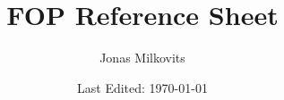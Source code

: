 

\renewcommand{\arraystretch}{1.75} 


\begin{titlepage}
  \title{FOP Reference Sheet} %
  \author{Jonas Milkovits}
  \date{Last Edited: \today}
\end{titlepage}



\maketitle
{} %
\tableofcontents
\clearpage
{} %

\begin{comment}
\section{Stuff that I skipped cuz of chapter 4}

\begin{tabular}{ | p{0.2\textwidth} p{0.75\textwidth} | } 
	\hline
	\makecell[l]{Exceptions aus \\ Lambda-Ausdrücken} &
	\makecell[l]{$\triangleright$ Kapitel 5: 47 - 50  } \\ \hline
	
	\makecell[l]{Listen von \\ Lambda-Ausdrücken} & \makecell[l]{$\triangleright$ Kapitel 7: 60 - 65 } \\ \hline
	
	\makecell[l]{Methodennamen als \\ Lambda-Ausdrücke} & \makecell[l]{$\triangleright$ Kapitel 8: 55 - 84  } \\ \hline

	\makecell[l]{Streams in Racket} & \makecell[l]{$\triangleright$ Kapitel 8: 122 - 133  } \\ \hline

	\makecell[l]{ActionListener Lambda} & \makecell[l]{$\triangleright$ Kapitel 10: 68-69  } \\ \hline

	\end{tabular}
\end{comment}

